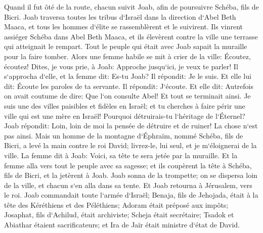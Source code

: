 \verse Quand il fut ôté de la route, chacun suivit Joab, afin de poursuivre Schéba, fils de Bicri. 
\verse Joab traversa toutes les tribus d`Israël dans la direction d`Abel Beth Maaca, et tous les hommes d`élite se rassemblèrent et le suivirent. 
\verse Ils vinrent assiéger Schéba dans Abel Beth Maaca, et ils élevèrent contre la ville une terrasse qui atteignait le rempart. Tout le peuple qui était avec Joab sapait la muraille pour la faire tomber. 
\verse Alors une femme habile se mit à crier de la ville: Écoutez, écoutez! Dites, je vous prie, à Joab: Approche jusqu`ici, je veux te parler! 
\verse Il s`approcha d`elle, et la femme dit: Es-tu Joab? Il répondit: Je le suis. Et elle lui dit: Écoute les paroles de ta servante. Il répondit: J`écoute. 
\verse Et elle dit: Autrefois on avait coutume de dire: Que l`on consulte Abel! Et tout se terminait ainsi. 
\verse Je suis une des villes paisibles et fidèles en Israël; et tu cherches à faire périr une ville qui est une mère en Israël! Pourquoi détruirais-tu l`héritage de l`Éternel? 
\verse Joab répondit: Loin, loin de moi la pensée de détruire et de ruiner! 
\verse La chose n`est pas ainsi. Mais un homme de la montagne d`Éphraïm, nommé Schéba, fils de Bicri, a levé la main contre le roi David; livrez-le, lui seul, et je m`éloignerai de la ville. La femme dit à Joab: Voici, sa tête te sera jetée par la muraille. 
\verse Et la femme alla vers tout le peuple avec sa sagesse; et ils coupèrent la tête à Schéba, fils de Bicri, et la jetèrent à Joab. Joab sonna de la trompette; on se dispersa loin de la ville, et chacun s`en alla dans sa tente. Et Joab retourna à Jérusalem, vers le roi. 
\verse Joab commandait toute l`armée d`Israël; Benaja, fils de Jehojada, était à la tête des Kéréthiens et des Péléthiens; 
\verse Adoram était préposé aux impôts; Josaphat, fils d`Achilud, était archiviste; 
\verse Scheja était secrétaire; Tsadok et Abiathar étaient sacrificateurs; 
\verse et Ira de Jaïr était ministre d`état de David. 

